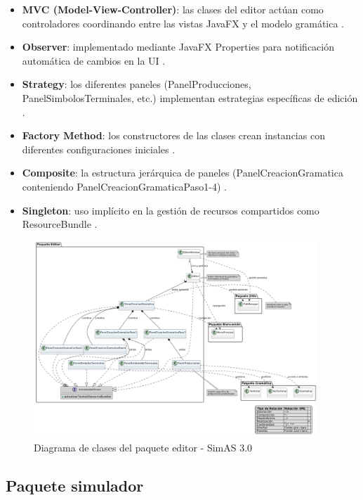 \begin{itemize}
    \item \textbf{MVC (Model-View-Controller)}: las clases del editor actúan como controladores coordinando entre las vistas JavaFX y el modelo gramática \cite{burbeck1992applications}.
    \item \textbf{Observer}: implementado mediante JavaFX Properties para notificación automática de cambios en la UI \cite{gamma1995design}.
    \item \textbf{Strategy}: los diferentes paneles (PanelProducciones, PanelSimbolosTerminales, etc.) implementan estrategias específicas de edición \cite{gamma1995design}.
    \item \textbf{Factory Method}: los constructores de las clases crean instancias con diferentes configuraciones iniciales \cite{gamma1995design}.
    \item \textbf{Composite}: la estructura jerárquica de paneles (PanelCreacionGramatica conteniendo PanelCreacionGramaticaPaso1-4) \cite{gamma1995design}.
    \item \textbf{Singleton}: uso implícito en la gestión de recursos compartidos como ResourceBundle \cite{gamma1995design}.
\end{itemize}

\begin{figure}[p]
    \centering
    \includegraphics[angle=90,width=0.95\textwidth]{figuras/Cap9/diagrama_editor.png}
    \caption{Diagrama de clases del paquete editor - SimAS 3.0}
    \label{fig:diagrama_editor}
\end{figure}

\subsection{Paquete simulador}

